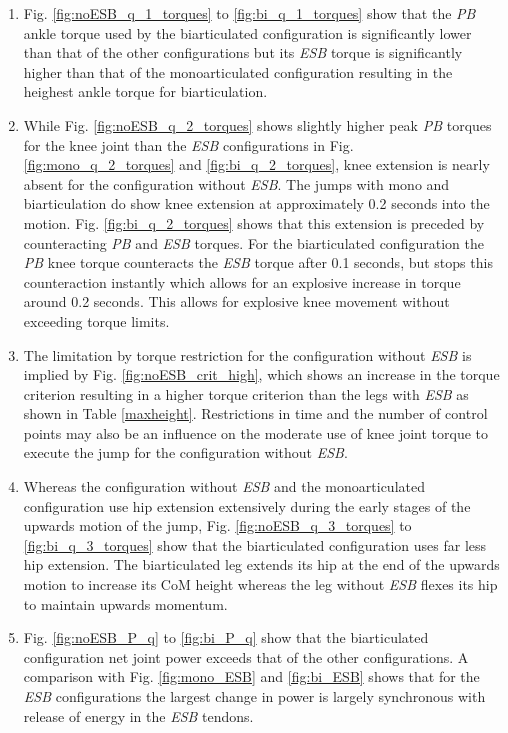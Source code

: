 \documentclass[letterpaper, 10 pt, conference]{ieeeconf}  %
\begin{document}
\begin{enumerate}
	\item Fig. \ref{fig:noESB_q_1_torques} to \ref{fig:bi_q_1_torques} show that the \textit{PB} ankle torque used by the biarticulated configuration is significantly lower than that of the other configurations but its \textit{ESB} torque is significantly higher than that of the monoarticulated configuration resulting in the heighest ankle torque for biarticulation. 
	
	\item While Fig. \ref{fig:noESB_q_2_torques} shows slightly higher peak \textit{PB} torques for the knee joint than the \textit{ESB} configurations in Fig. \ref{fig:mono_q_2_torques} and \ref{fig:bi_q_2_torques}, knee extension is nearly absent for the configuration without \textit{ESB}. The jumps with mono and biarticulation do show knee extension at approximately 0.2 seconds into the motion. Fig. \ref{fig:bi_q_2_torques} shows that this extension is preceded by counteracting \textit{PB} and \textit{ESB} torques. For the biarticulated configuration the \textit{PB} knee torque counteracts the \textit{ESB} torque after 0.1 seconds, but stops this counteraction instantly which allows for an explosive increase in torque around 0.2 seconds. This allows for explosive knee movement without exceeding torque limits.
	
	\item The limitation by torque restriction for the configuration without \textit{ESB} is implied by Fig. \ref{fig:noESB_crit_high}, which shows an increase in the torque criterion resulting in a higher torque criterion than the legs with \textit{ESB} as shown in Table \ref{maxheight}. Restrictions in time and the number of control points may also be an influence on the moderate use of knee joint torque to execute the jump for the configuration without \textit{ESB}.
	
	\item Whereas the configuration without \textit{ESB} and the monoarticulated configuration use hip extension extensively during the early stages of the upwards motion of the jump, Fig. \ref{fig:noESB_q_3_torques} to \ref{fig:bi_q_3_torques} show that the biarticulated configuration uses far less hip extension. The biarticulated leg extends its hip at the end of the upwards motion to increase its CoM height whereas the leg without \textit{ESB} flexes its hip to maintain upwards momentum.
	
	\item Fig. \ref{fig:noESB_P_q} to \ref{fig:bi_P_q} show that the biarticulated configuration net joint power exceeds that of the other configurations. A comparison with Fig. \ref{fig:mono_ESB} and \ref{fig:bi_ESB} shows that for the \textit{ESB} configurations the largest change in power is largely synchronous with release of energy in the \textit{ESB} tendons.
\end{enumerate}
\end{document}
